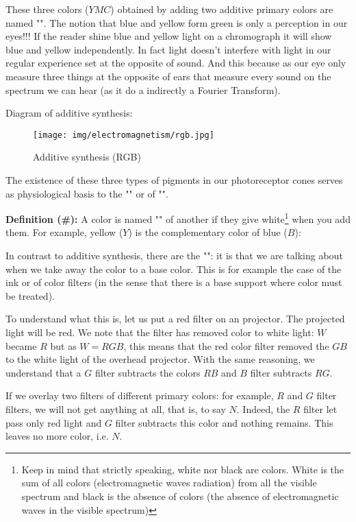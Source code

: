 	These three colors ($YMC$) obtained by adding two additive primary colors are named "". The notion that blue and yellow form green is only a perception in our eyes!!! If the reader shine blue and yellow light on a chromograph it will show blue and yellow independently. In fact light doesn't interfere with light in our regular experience set at the opposite of sound. And this because as our eye only measure three things at the opposite of ears that measure every sound on the spectrum we can hear (as it do a indirectly a Fourier Transform).
	
	Diagram of additive synthesis:
	\begin{figure}[H]
		\centering
		\texttt{[image: img/electromagnetism/rgb.jpg]}
		\caption{Additive synthesis (RGB)}
	\end{figure}
	The existence of these three types of pigments in our photoreceptor cones serves as physiological basis to the "" or of "".
	
	\textbf{Definition (\#\mydef):} A color is named "" of another if they give white\footnote{Keep in mind that strictly speaking, white nor black are colors. White is the sum of all colors (electromagnetic waves radiation) from all the visible spectrum and black is the absence of colors (the absence of electromagnetic waves in the visible spectrum)} when you add them. For example, yellow ($Y$) is the complementary color of blue ($B$):
	
	In contrast to additive synthesis, there are the "": it is that we are talking about when we take away the color to a base color. This is for example the case of the ink or of color filters (in the sense that there is a base support where color must be treated).
	
	To understand what this is, let us put a red filter on an projector. The projected light will be red. We note that the filter has removed color to white light: $W$ became $R$ but as $W = RGB$, this means that the red color filter removed the $GB$ to the white light of the overhead projector. With the same reasoning, we understand that a $G$ filter subtracts the colors $RB$ and $B$ filter subtracts $RG$.
	
	If we overlay two filters of different primary colors: for example, $R$ and $G$ filter filters, we will not get anything at all, that is, to say $N$. Indeed, the $R$ filter let pass only red light and $G$ filter subtracts this color and nothing remains. This leaves no more color, i.e. $N$.
	

